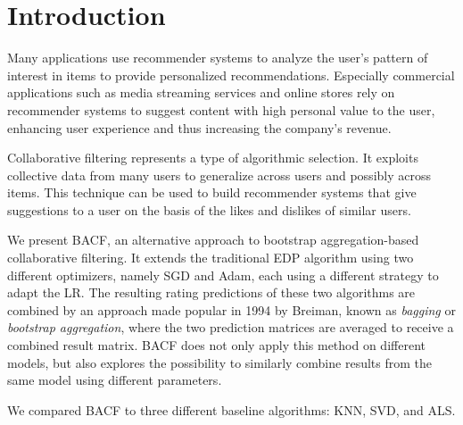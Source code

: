 \section{Introduction}
Many applications use recommender systems to analyze the user's pattern of interest in items to provide personalized recommendations. Especially commercial applications such as media streaming services and online stores rely on recommender systems to suggest content with high personal value to the user, enhancing user experience and thus increasing the company's revenue.

Collaborative filtering represents a type of algorithmic selection. It exploits collective data from many users to generalize across users and possibly across items. This technique can be used to build recommender systems that give suggestions to a user on the basis of the likes and dislikes of similar users.

We present BACF, an alternative approach to bootstrap aggregation-based collaborative filtering. It extends the traditional \ac{EDP} algorithm\cite{gupta_2020} using two different optimizers, namely \ac{SGD} and Adam, each using a different strategy to adapt the \ac{LR}. The resulting rating predictions of these two algorithms are combined by an approach made popular in 1994 by Breiman\cite{breiman}, known as \textit{bagging} or \textit{bootstrap aggregation}, where the two prediction matrices are averaged to receive a combined result matrix. BACF does not only apply this method on different models, but also explores the possibility to similarly combine results from the same model using different parameters.

We compared BACF to three different baseline algorithms: \ac{KNN}, \ac{SVD}, and \ac{ALS}. 